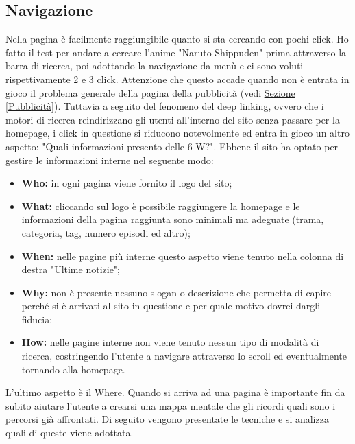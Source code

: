 \subsection{Navigazione} \label{Navigazione}
Nella pagina è facilmente raggiungibile quanto si sta cercando con pochi click. Ho fatto il test per andare a cercare l'anime "Naruto Shippuden" prima attraverso la barra di ricerca, poi adottando la navigazione da menù e ci sono voluti rispettivamente 2 e 3 click. Attenzione che questo accade quando non è entrata in gioco il problema generale della pagina della pubblicità (vedi \hyperref[Pubblicità]{Sezione \ref{Pubblicità}}).
Tuttavia a seguito del fenomeno del deep linking, ovvero che i motori di ricerca reindirizzano gli utenti all'interno del sito senza passare per la homepage, i click in questione si riducono notevolmente ed entra in gioco un altro aspetto: "Quali informazioni presento delle 6 W?".
Ebbene il sito ha optato per gestire le informazioni interne nel seguente modo:
\begin{itemize}
	\item \textbf{Who:} in ogni pagina viene fornito il logo del sito;
	\item \textbf{What:} cliccando sul logo è possibile raggiungere la homepage e le informazioni della pagina raggiunta sono minimali ma adeguate (trama, categoria, tag, numero episodi ed altro);
	\item \textbf{When:} nelle pagine più interne questo aspetto viene tenuto nella colonna di destra "Ultime notizie";
	\item \textbf{Why:} non è presente nessuno slogan o descrizione che permetta di capire perché si è arrivati al sito in questione e per quale motivo dovrei dargli fiducia;
	\item \textbf{How:} nelle pagine interne non viene tenuto nessun tipo di modalità di ricerca, costringendo l'utente a navigare attraverso lo scroll ed eventualmente tornando alla homepage. 
\end{itemize}
L'ultimo aspetto è il Where. Quando si arriva ad una pagina è importante fin da subito aiutare l'utente a crearsi una mappa mentale che gli ricordi quali sono i percorsi già affrontati. Di seguito vengono presentate le tecniche e si analizza quali di queste viene adottata.

\newpage

